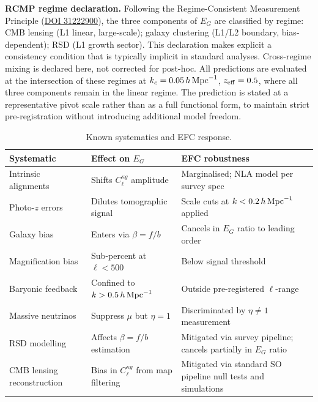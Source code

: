 \documentclass[11pt]{article}
\begin{document}
\textbf{RCMP regime declaration.}
Following the Regime-Consistent Measurement Principle
(\href{https://doi.org/10.6084/m9.figshare.31222900}{DOI 31222900}),
the three components of $E_G$ are classified by regime:
CMB lensing (L1 linear, large-scale);
galaxy clustering (L1/L2 boundary, bias-dependent);
RSD (L1 growth sector).
This declaration makes explicit a consistency condition that is
typically implicit in standard analyses.
Cross-regime mixing is declared here, not corrected for post-hoc.
All predictions are evaluated at the intersection of these regimes
at $k_c = 0.05\,h\,{\rm Mpc}^{-1}$, $z_{\rm eff} = 0.5$,
where all three components remain in the linear regime.
The prediction is stated at a representative pivot scale rather than
as a full functional form, to maintain strict pre-registration
without introducing additional model freedom.

\begin{table}[!ht]
\centering
\caption{Known systematics and EFC response.}
\vspace{4pt}
\begin{tabular}{@{}lp{4cm}p{5cm}@{}}
\toprule
Systematic & Effect on $E_G$ & EFC robustness \\
\midrule
Intrinsic alignments & Shifts $C_\ell^{\kappa g}$ amplitude &
  Marginalised; NLA model per survey spec \\[3pt]
Photo-$z$ errors & Dilutes tomographic signal &
  Scale cuts at $k < 0.2\,h\,{\rm Mpc}^{-1}$ applied \\[3pt]
Galaxy bias & Enters via $\beta = f/b$ &
  Cancels in $E_G$ ratio to leading order \\[3pt]
Magnification bias & Sub-percent at $\ell < 500$ &
  Below signal threshold \\[3pt]
Baryonic feedback & Confined to $k > 0.5\,h\,{\rm Mpc}^{-1}$ &
  Outside pre-registered $\ell$-range \\[3pt]
Massive neutrinos & Suppress $\mu$ but $\eta = 1$ &
  Discriminated by $\eta \ne 1$ measurement \\[3pt]
RSD modelling & Affects $\beta = f/b$ estimation &
  Mitigated via survey pipeline; cancels partially in $E_G$ ratio \\[3pt]
CMB lensing reconstruction & Bias in $C_\ell^{\kappa g}$ from map filtering &
  Mitigated via standard SO pipeline null tests and simulations \\
\bottomrule
\end{tabular}
\label{tab:systematics}
\end{table}
\end{document}

